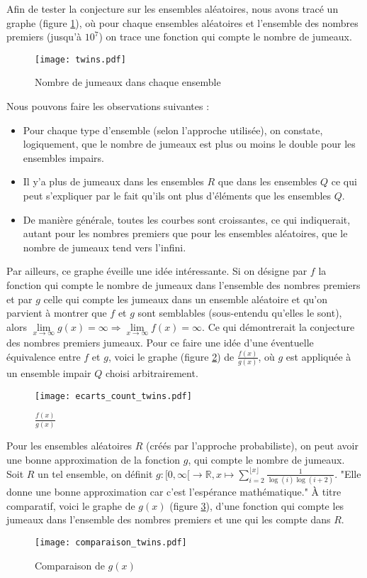 \documentclass[../main.tex]{subfiles}
\begin{document}
	Afin de tester la conjecture sur les ensembles aléatoires, nous avons tracé un graphe (figure \ref{im:image4}), où pour chaque ensembles aléatoires et l'ensemble des nombres premiers (jusqu'à $10^{7}$) on trace une fonction qui compte le nombre de jumeaux.
\begin{figure}[htbp]
	\centerline{\texttt{[image: twins.pdf]}}
\caption{Nombre de jumeaux dans chaque ensemble }
	\label{im:image4}
\end{figure}
 Nous pouvons faire les observations suivantes : 
 	\begin{itemize}
	\item Pour chaque type d'ensemble (selon l'approche utilisée), on constate, logiquement, que le nombre de jumeaux est plus ou moins le double pour les ensembles impairs.
	\item Il y'a plus de jumeaux dans les ensembles $R$ que dans les ensembles $Q$ ce qui peut s'expliquer par le fait qu'ils ont plus d'éléments que les ensembles $Q$.
	\item De manière générale, toutes les courbes sont croissantes, ce qui indiquerait, autant pour les nombres premiers que pour les ensembles aléatoires, que le nombre de jumeaux tend vers l'infini. 
	\end{itemize}
	
	Par ailleurs, ce graphe éveille une idée intéressante. Si on désigne par $f$ la fonction qui compte le nombre de jumeaux dans l'ensemble des nombres premiers et par $g$ celle qui compte les jumeaux dans un ensemble aléatoire et qu'on parvient à montrer que $f$ et $g$ sont semblables (sous-entendu qu'elles le sont), alors $\lim\limits_{x \rightarrow \infty} g(x) = \infty \Rightarrow \lim\limits_{x \rightarrow \infty} f(x) = \infty $. Ce qui démontrerait la conjecture des nombres premiers jumeaux. Pour ce faire une idée d'une éventuelle équivalence entre $f$ et $g$, voici le graphe (figure \ref{im:image6}) de $\frac{f(x)}{g(x)}$, où $g$ est appliquée à un ensemble impair $Q$ choisi arbitrairement. 	
\begin{figure}[htbp]
	\centerline{\texttt{[image: ecarts\_count\_twins.pdf]}}
\caption{$\frac{f(x)}{g(x)}$}
	\label{im:image6}
\end{figure}

	Pour les ensembles aléatoires $R$ (créés par l'approche probabiliste), on peut avoir une bonne approximation de la fonction $g$, qui compte le nombre de jumeaux. Soit $R$ un tel ensemble, on définit $ g : [0, \infty[ \rightarrow \mathbb{R}, x \mapsto \sum_{i = 2}^{\lfloor x \rfloor}  \frac{1}{\log(i) \log(i+2)}$. "Elle donne une bonne approximation car c'est l'espérance mathématique." À titre comparatif, voici le graphe de $g(x)$ (figure \ref{im:image7}), d'une fonction qui compte les jumeaux dans l'ensemble des nombres premiers et une qui les compte dans $R$.
\begin{figure}[htbp]
	\centerline{\texttt{[image: comparaison\_twins.pdf]}}
\caption{Comparaison de $g(x)$}
	\label{im:image7}
\end{figure}
\end{document}
